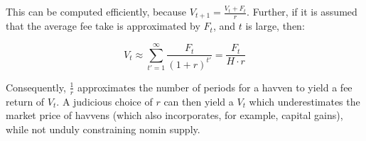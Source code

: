 \noindent This can be computed efficiently, because $V_{t+1} = \frac{V_t + F_t}{r}$. 
Further, if it is assumed that the average fee take is approximated by $F_t$, and $t$ is large, then:

\vspace{2mm}

\begin{equation}
    V_t \approx \sum_{t'=1}^{\infty} \frac{F_t}{(1 + r)^{t'}} = \frac{F_t}{H \cdot r}
\end{equation}

\vspace{3mm}

\noindent Consequently, $\frac{1}{r}$ approximates the number of periods for a havven to yield a fee return of $V_t$.
A judicious choice of $r$ can then yield a $V_t$ which underestimates the market price of havvens (which also incorporates,
for example, capital gains), while not unduly constraining nomin supply.

\newpage

